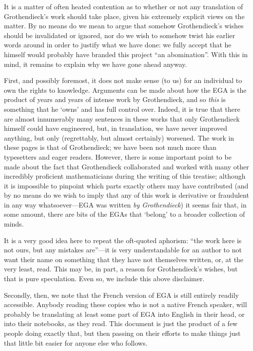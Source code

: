 It is a matter of often heated contention as to whether or not any translation of Grothendieck's work should take place, given his extremely explicit views on the matter.
By no means do we mean to argue that somehow Grothendieck's wishes should be invalidated or ignored, nor do we wish to somehow twist his earlier words around in order to justify what we have done: we fully accept that he himself would probably have branded this project ``an abomination''.
With this in mind, it remains to explain why we have gone ahead anyway.

First, and possibly foremost, it does not make sense (to us) for an individual to own the rights to knowledge.
Arguments can be made about how the EGA is the product of years and years of intense work by Grothendieck, and so \emph{this} is something that he `owns' and has full control over.
Indeed, it is true that there are almost innumerably many sentences in these works that only Grothendieck himself could have engineered, but, in translation, we have never improved anything, but only (regrettably, but almost certainly) worsened.
The work in these pages is that of Grothendieck; we have been not much more than typesetters and eager readers.
However, there is some important point to be made about the fact that Grothendieck collaborated and worked with many other incredibly proficient mathematicians during the writing of this treatise; although it is impossible to pinpoint which parts exactly others may have contributed (and by no means do we wish to imply that any of this work is derivative or fraudulent in any way whatsoever---EGA was written \emph{by Grothendieck}) it seems fair that, in some amount, there are bits of the EGAs that `belong' to a broader collection of minds.

It is a very good idea here to repeat the oft-quoted aphorism: ``the work here is not ours, but any mistakes are''---it is very understandable for an author to not want their name on something that they have not themselves written, or, at the very least, read.
This may be, in part, a reason for Grothendieck's wishes, but that is pure speculation.
Even so, we include this above disclaimer.

Secondly, then, we note that the French version of EGA is still entirely readily accessible.
Anybody reading these copies who is not a native French speaker, will probably be translating at least some part of EGA into English in their head, or into their notebooks, as they read.
This document is just the product of a few people doing exactly that, but then passing on their efforts to make things just that little bit easier for anyone else who follows.

